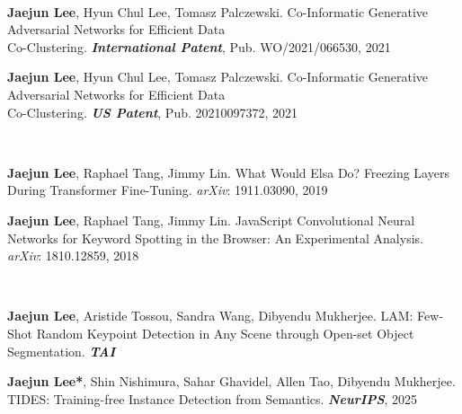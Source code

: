 \\
\begin{cvenumerate}[10]\vspace*{-0.15cm}
\item \hypertarget{CI-GAN:International}{\textcolor{gray!99!black}{\textbf{Jaejun Lee}}, Hyun Chul Lee, Tomasz Palczewski. Co-Informatic Generative Adversarial Networks for Efficient Data \\Co-Clustering. \textbf{\textit{International Patent}}, Pub. WO/2021/066530, 2021}
\item \hypertarget{CI-GAN:US}{\textcolor{gray!99!black}{\textbf{Jaejun Lee}}, Hyun Chul Lee, Tomasz Palczewski. Co-Informatic Generative Adversarial Networks for Efficient Data \\Co-Clustering. \textbf{\textit{US Patent}}, Pub. 20210097372, 2021}
\end{cvenumerate}
\hfill

\\
\begin{cvenumerate}[12]\vspace*{-0.15cm}
\item \hypertarget{Elsa:arXiv}{\textcolor{gray!99!black}{\textbf{Jaejun Lee}}, Raphael Tang, Jimmy Lin. What Would Elsa Do? Freezing Layers During Transformer Fine-Tuning. \textit{arXiv}: 1911.03090, 2019}
\item \hypertarget{JavaScript:arXiv}{\textcolor{gray!99!black}{\textbf{Jaejun Lee}}, Raphael Tang, Jimmy Lin. JavaScript Convolutional Neural Networks for Keyword Spotting in the Browser: An Experimental Analysis. \textit{arXiv}: 1810.12859, 2018}
\end{cvenumerate}
\hfill

\\
\begin{cvenumerate}[14]\vspace*{-0.15cm}
\item \hypertarget{LAM:TAI}{\textcolor{gray!99!black}{\textbf{Jaejun Lee}}, Aristide Tossou, Sandra Wang, Dibyendu Mukherjee. LAM: Few-Shot Random Keypoint Detection in Any Scene through Open-set
Object Segmentation. \textbf{\textit{TAI}}}
\item \hypertarget{TIDES:NeurIPS}{\textcolor{gray!99!black}{\textbf{Jaejun Lee*}}, Shin Nishimura, Sahar Ghavidel, Allen Tao, Dibyendu Mukherjee. TIDES: Training-free Instance Detection from Semantics. \textbf{\textit{NeurIPS}}, 2025}
\end{cvenumerate}